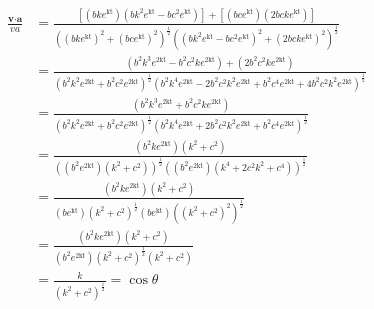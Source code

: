 \documentclass[]{article}
\newcommand{\bd}{\textbf}
\begin{document}
\begin{equation}
\begin{split}
\frac{\bd{v} \cdot \bd{a}}{va} &= 
\frac{[(bke^\text{kt})(bk^2e^\text{kt} - bc^2e^\text{kt})] + [(bce^\text{kt})(2bcke^\text{kt})]}
{({(bke^\text{kt})^2 + (bce^\text{kt})^2})^\frac{1}{2} ({(bk^2e^\text{kt} - bc^2e^\text{kt})^2 + (2bcke^\text{kt})^2})^\frac{1}{2}} \\
&= 
\frac{(b^2k^3e^\text{2kt} - b^2c^2ke^\text{2kt}) + (2b^2c^2ke^\text{2kt})}
{({b^2k^2e^\text{2kt} + b^2c^2e^\text{2kt}})^\frac{1}{2} ({b^2k^4e^\text{2kt} - 2b^2c^2k^2e^\text{2kt} + b^2c^4e^\text{2kt} + 4b^2c^2k^2e^\text{2kt}})^\frac{1}{2}} \\
&= 
\frac{(b^2k^3e^\text{2kt} + b^2c^2ke^\text{2kt})}
{({b^2k^2e^\text{2kt} + b^2c^2e^\text{2kt}})^\frac{1}{2} ({b^2k^4e^\text{2kt} + 2b^2c^2k^2e^\text{2kt} + b^2c^4e^\text{2kt}})^\frac{1}{2}} \\
&= 
\frac{(b^2ke^\text{2kt})(k^2 + c^2)}
{((b^2e^\text{2kt})(k^2 + c^2))^\frac{1}{2} ((b^2e^\text{2kt})(k^4 + 2c^2k^2 + c^4))^\frac{1}{2}} \\
&= 
\frac{(b^2ke^\text{2kt})(k^2 + c^2)}
{(be^\text{kt})({k^2 + c^2})^\frac{1}{2} (be^\text{kt})({(k^2 + c^2)^2})^\frac{1}{2}} \\
&= 
\frac{(b^2ke^\text{2kt})(k^2 + c^2)}
{(b^2e^\text{2kt})({k^2 + c^2})^\frac{1}{2}(k^2 + c^2)} \\
&= 
\frac{k}
{({k^2 + c^2})^\frac{1}{2}} = \cos \theta \\
\end{split}
\end{equation}
\end{document}
